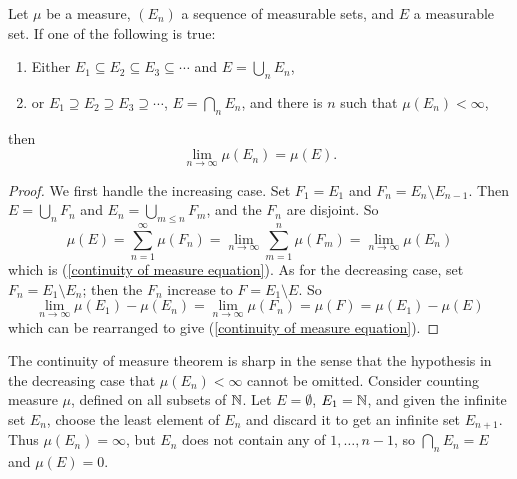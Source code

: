 \begin{theorem}
Let $\mu$ be a measure, $(E_{n})$ a sequence of measurable sets, and $E$ a measurable set.
If one of the following is true:
\begin{enumerate}
\item Either $E_{1} \subseteq E_{2} \subseteq E_{3} \subseteq \cdots$ and $E = \bigcup_{n} E_{n}$,
\item or $E_{1} \supseteq E_{2} \supseteq E_{3} \supseteq \cdots$, $E = \bigcap_{n} E_{n}$, and there is $n$ such that $\mu(E_{n}) < \infty$,
\end{enumerate}
then
\begin{equation}
\label{continuity of measure equation}
\lim_{n \to \infty} \mu(E_{n}) = \mu(E).
\end{equation}

\end{theorem}
\begin{proof}
We first handle the increasing case.
Set $F_{1} = E_{1}$ and $F_{n} = E_{n} \setminus E_{n - 1}$. Then $E = \bigcup_{n} F_{n}$ and $E_{n} = \bigcup_{m \leq n} F_{m}$, and the $F_{n}$ are disjoint.
So
\[\mu(E) = \sum_{n=1}^{\infty} \mu(F_{n}) = \lim_{n \to \infty} \sum_{m=1}^{n} \mu(F_{m}) = \lim_{n \to \infty} \mu(E_{n})\]
which is (\ref{continuity of measure equation}).
As for the decreasing case, set $F_{n} = E_{1} \setminus E_{n}$; then the $F_{n}$ increase to $F = E_{1} \setminus E$. So
\[\lim_{n \to \infty} \mu(E_{1}) - \mu(E_{n}) = \lim_{n \to \infty} \mu(F_{n}) = \mu(F) = \mu(E_{1}) - \mu(E)\]
which can be rearranged to give (\ref{continuity of measure equation}).
\end{proof}

\begin{example}
The continuity of measure theorem is sharp in the sense that the hypothesis in the decreasing case that $\mu(E_{n}) < \infty$ cannot be omitted.
Consider counting measure $\mu$, defined on all subsets of $\mathbb{N}$.
Let $E = \emptyset$, $E_{1} = \mathbb{N}$, and given the infinite set $E_{n}$, choose the least element of $E_{n}$ and discard it to get an infinite set $E_{n + 1}$.
Thus $\mu(E_{n}) = \infty$, but $E_{n}$ does not contain any of $1, \dots, n - 1$, so $\bigcap_{n} E_{n} = E$ and $\mu(E) = 0$.
\end{example}

